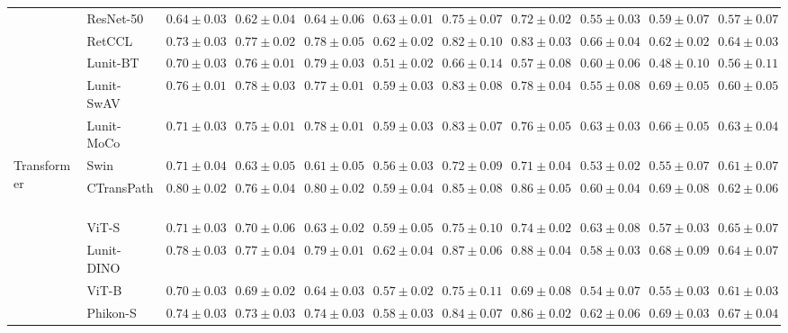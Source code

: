 \begin{tabular}{ll|cccc|c|cccc}
 & ResNet-50~\cite{he2015deep} & $0.64 \pm 0.03$ & $0.62 \pm 0.04$ & $0.64 \pm 0.06$ & $0.63 \pm 0.01$ & $0.75 \pm 0.07$ & $0.72 \pm 0.02$ & $0.55 \pm 0.03$ & $0.59 \pm 0.07$ & $0.57 \pm 0.07$ \\
 & RetCCL~\cite{wang2023retccl} & $0.73 \pm 0.03$ & $0.77 \pm 0.02$ & $0.78 \pm 0.05$ & $0.62 \pm 0.02$ & $0.82 \pm 0.10$ & $0.83 \pm 0.03$ & $0.66 \pm 0.04$ & $0.62 \pm 0.02$ & $0.64 \pm 0.03$ \\
 & Lunit-BT~\cite{kang2023benchmarking} & $0.70 \pm 0.03$ & $0.76 \pm 0.01$ & $0.79 \pm 0.03$ & $0.51 \pm 0.02$ & $0.66 \pm 0.14$ & $0.57 \pm 0.08$ & $0.60 \pm 0.06$ & $0.48 \pm 0.10$ & $0.56 \pm 0.11$ \\
 & Lunit-SwAV~\cite{kang2023benchmarking} & $0.76 \pm 0.01$ & $0.78 \pm 0.03$ & $0.77 \pm 0.01$ & $0.59 \pm 0.03$ & $0.83 \pm 0.08$ & $0.78 \pm 0.04$ & $0.55 \pm 0.08$ & $0.69 \pm 0.05$ & $0.60 \pm 0.05$ \\
 & Lunit-MoCo~\cite{kang2023benchmarking} & $0.71 \pm 0.03$ & $0.75 \pm 0.01$ & $0.78 \pm 0.01$ & $0.59 \pm 0.03$ & $0.83 \pm 0.07$ & $0.76 \pm 0.05$ & $0.63 \pm 0.03$ & $0.66 \pm 0.05$ & $0.63 \pm 0.04$ \\
\cline{1-11}
\multirow[t]{14}{*}{Transformer} & Swin~\cite{liu2021swin} & $0.71 \pm 0.04$ & $0.63 \pm 0.05$ & $0.61 \pm 0.05$ & $0.56 \pm 0.03$ & $0.72 \pm 0.09$ & $0.71 \pm 0.04$ & $0.53 \pm 0.02$ & $0.55 \pm 0.07$ & $0.61 \pm 0.07$ \\
 & CTransPath~\cite{wang2022transformer} & $0.80 \pm 0.02$ & $0.76 \pm 0.04$ & $0.80 \pm 0.02$ & $0.59 \pm 0.04$ & $0.85 \pm 0.08$ & $0.86 \pm 0.05$ & $0.60 \pm 0.04$ & $0.69 \pm 0.08$ & $0.62 \pm 0.06$ \\
 & ViT-S~\cite{kolesnikov2021image} & $0.71 \pm 0.03$ & $0.70 \pm 0.06$ & $0.63 \pm 0.02$ & $0.59 \pm 0.05$ & $0.75 \pm 0.10$ & $0.74 \pm 0.02$ & $0.63 \pm 0.08$ & $0.57 \pm 0.03$ & $0.65 \pm 0.07$ \\
 & Lunit-DINO~\cite{kang2023benchmarking} & $0.78 \pm 0.03$ & $0.77 \pm 0.04$ & $0.79 \pm 0.01$ & $0.62 \pm 0.04$ & $0.87 \pm 0.06$ & $\mathbf{0.88 \pm 0.04}$ & $0.58 \pm 0.03$ & $0.68 \pm 0.09$ & $0.64 \pm 0.07$ \\
 & ViT-B~\cite{kolesnikov2021image} & $0.70 \pm 0.03$ & $0.69 \pm 0.02$ & $0.64 \pm 0.03$ & $0.57 \pm 0.02$ & $0.75 \pm 0.11$ & $0.69 \pm 0.08$ & $0.54 \pm 0.07$ & $0.55 \pm 0.03$ & $0.61 \pm 0.03$ \\
 & Phikon-S~\cite{filiot2023scaling} & $0.74 \pm 0.03$ & $0.73 \pm 0.03$ & $0.74 \pm 0.03$ & $0.58 \pm 0.03$ & $0.84 \pm 0.07$ & $0.86 \pm 0.02$ & $0.62 \pm 0.06$ & $0.69 \pm 0.03$ & $0.67 \pm 0.04$ \\

\end{tabular}
